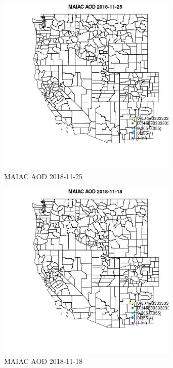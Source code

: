 \begin{figure} 
\centering  
\includegraphics[width=0.77\textwidth]{Code_Outputs/Report_ML_input_PM25_Step4_part_e_de_duplicated_aveswNAs_MapObsMAIAC_AOD2018-11-25.jpg} 
\caption{\label{fig:Report_ML_input_PM25_Step4_part_e_de_duplicated_aveswNAsMapObsMAIAC_AOD2018-11-25}MAIAC AOD 2018-11-25} 
\end{figure} 
 

\begin{figure} 
\centering  
\includegraphics[width=0.77\textwidth]{Code_Outputs/Report_ML_input_PM25_Step4_part_e_de_duplicated_aveswNAs_MapObsMAIAC_AOD2018-11-18.jpg} 
\caption{\label{fig:Report_ML_input_PM25_Step4_part_e_de_duplicated_aveswNAsMapObsMAIAC_AOD2018-11-18}MAIAC AOD 2018-11-18} 
\end{figure} 
 

